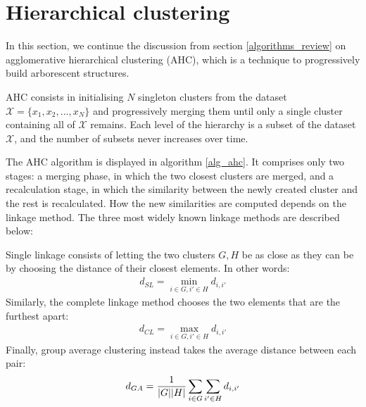 \documentclass[../main.tex]{subfiles}
\begin{document}
\section{Hierarchical clustering} \label{section_hierarchical}
In this section, we continue the discussion from section \ref{algorithms_review} on agglomerative hierarchical clustering (AHC), which is a technique to progressively build arborescent structures.
\par AHC consists in initialising $N$ singleton clusters from the dataset $\mathcal{X} = \{x_1, x_2, ..., x_N\}$ and progressively merging them until only a single cluster containing all of $\mathcal{X}$ remains. Each level of the hierarchy is a subset of the dataset $\mathcal{X}$, and the number of subsets never increases over time.
\par The AHC algorithm is displayed in algorithm \ref{alg_ahc}. It comprises only two stages: a merging phase, in which the two closest clusters are merged, and a recalculation stage, in which the similarity between the newly created cluster and the rest is recalculated. How the new similarities are computed depends on the linkage method. The three most widely known linkage methods \cite{hastie2008} are described below:
\par Single linkage consists of letting the two clusters $G, H$ be as close as they can be by choosing the distance of their closest elements. In other words:
\begin{align*}
d_{SL} = \min_{i \in G, i' \in H} d_{i, i'}
\end{align*}
Similarly, the complete linkage method chooses the two elements that are the furthest apart:
\begin{align*}
d_{CL} = \max_{i \in G, i' \in H} d_{i, i'}
\end{align*}
Finally, group average clustering instead takes the average distance between each pair:
\begin{align*}
d_{GA} = \frac{1}{\lvert G\rvert\lvert H\rvert}\sum_{i\in G}\sum_{i'\in H}d_{i, i'}
\end{align*}
\end{document}
